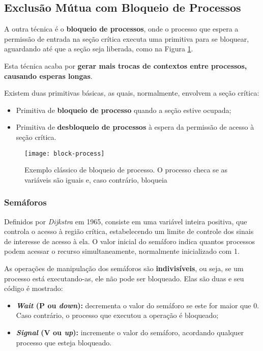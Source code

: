 \subsection{Exclusão Mútua com Bloqueio de Processos}
A outra técnica é o \textbf{bloqueio de processos}, onde o processo que espera a permissão de entrada na seção crítica executa uma primitiva para se bloquear, aguardando até que a seção seja liberada, como na Figura \ref{fig:block-process}.

Esta técnica acaba por \textbf{gerar mais trocas de contextos entre processos, causando esperas longas}.

Existem duas primitivas básicas, as quais, normalmente, envolvem a seção crítica:

\begin{itemize}
  \item Primitiva de \textbf{bloqueio de processo} quando a seção estive ocupada;

  \item Primitiva de \textbf{desbloqueio de processos} à espera da permissão de acesso à seção crítica.
\end{itemize}

\begin{figure}[H]
  \centering
  \texttt{[image: block-process]}
  \caption{Exemplo clássico de bloqueio de processo. O processo checa se as variáveis são iguais e, caso contrário, bloqueia}
  \label{fig:block-process}
\end{figure}




\subsubsection{Semáforos}
Definidos por \textit{Dijkstra} em 1965, consiste em uma variável inteira positiva, que controla o acesso à região crítica, estabelecendo um limite de controle dos sinais de interesse de acesso à ela. O valor inicial do semáforo indica quantos processos podem acessar o recurso simultaneamente, normalmente inicializado com 1.

As operações de manipulação dos semáforos são \textbf{indivisíveis}, ou seja, se um processo está executando-as, ele não pode ser bloqueado. Elas são duas e seu código é mostrado:

\begin{itemize}
  \item \textbf{\textit{Wait} (P ou \textit{down}):} decrementa o valor do semáforo se este for maior que 0. Caso contrário, o processo que executou a operação é bloqueado;

  \item \textbf{\textit{Signal} (V ou \textit{up}):} incremente o valor do semáforo, acordando qualquer processo que esteja bloqueado.
\end{itemize}

